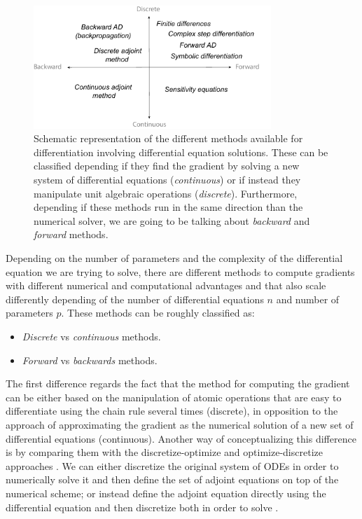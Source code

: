 \begin{figure}[]
    \centering
    \includegraphics[width=0.80\textwidth]{figures/scheme-methods.pdf}
    \caption{Schematic representation of the different methods available for differentiation involving differential equation solutions. These can be classified depending if they find the gradient by solving a new system of differential equations (\textit{continuous}) or if instead they manipulate unit algebraic operations (\textit{discrete}). Furthermore, depending if these methods run in the same direction than the numerical solver, we are going to be talking about \textit{backward} and \textit{forward} methods.}
    \label{fig:diff}
\end{figure}
Depending on the number of parameters and the complexity of the differential equation we are trying to solve, there are different methods to compute gradients with different numerical and computational advantages and that also scale differently depending of the number of differential equations $n$ and number of parameters $p$.
These methods can be roughly classified as:
\begin{itemize}
    \item \textit{Discrete} vs \textit{continuous} methods.
    \item \textit{Forward} vs \textit{backwards} methods.
\end{itemize}
The first difference regards the fact that the method for computing the gradient can be either based on the manipulation of atomic operations that are easy to differentiate using the chain rule several times (discrete), in opposition to the approach of approximating the gradient as the numerical solution of a new set of differential equations (continuous).
Another way of conceptualizing this difference is by comparing them with the discretize-optimize and optimize-discretize approaches \cite{bradley2013pde, Onken_Ruthotto_2020}.   
We can either discretize the original system of ODEs in order to numerically solve it and then define the set of adjoint equations on top of the numerical scheme; or instead define the adjoint equation directly using the differential equation and then discretize both in order to solve \cite{Giles_Pierce_2000}.

